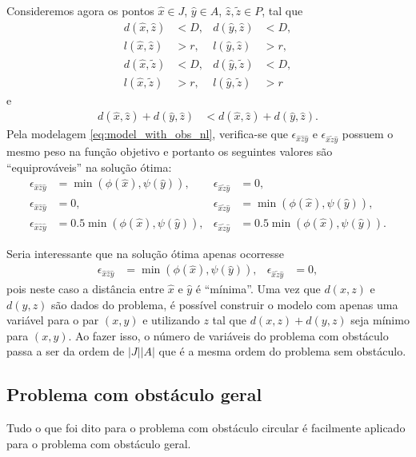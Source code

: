 Consideremos agora os pontos $\hat{x} \in J$, $\hat{y} \in A$, $\hat{z},
\tilde{z} \in P$, tal que
\begin{align*}
    d(\hat{x}, \hat{z}) &< D, & d(\hat{y}, \hat{z}) &< D, \\
    l(\hat{x}, \hat{z}) &> r, & l(\hat{y}, \hat{z}) &> r, \\
    d(\hat{x}, \tilde{z}) &< D, & d(\hat{y}, \tilde{z}) &< D, \\
    l(\hat{x}, \tilde{z}) &> r, & l(\hat{y}, \tilde{z}) &> r
\end{align*}
e
\begin{align*}
    d(\hat{x}, \hat{z}) + d(\hat{y}, \hat{z}) &< d(\hat{x}, \hat{z}) +
    d(\hat{y}, \hat{z}).
\end{align*}
Pela modelagem \eqref{eq:model_with_obs_nl}, verifica-se que
$\epsilon_{\hat{x}\hat{z}\hat{y}}$ e $\epsilon_{\hat{x}\tilde{z}\hat{y}}$
possuem o mesmo peso na fun\c{c}\~{a}o objetivo e portanto os seguintes valores
s\~{a}o ``equiprov\'{a}veis'' na solu\c{c}\~{a}o \'{o}tima:
\begin{align*}
    \epsilon_{\hat{x}\hat{z}\hat{y}} &= \min(\phi(\hat{x}), \psi(\hat{y})), &
    \epsilon_{\hat{x}\tilde{z}\hat{y}} &= 0, \\
    \epsilon_{\hat{x}\hat{z}\hat{y}} &= 0, &
    \epsilon_{\hat{x}\tilde{z}\hat{y}} &= \min(\phi(\hat{x}), \psi(\hat{y})), \\
    \epsilon_{\hat{x}\hat{z}\hat{y}} &= 0.5 \min(\phi(\hat{x}), \psi(\hat{y})), &
    \epsilon_{\hat{x}\tilde{z}\hat{y}} &= 0.5 \min(\phi(\hat{x}), \psi(\hat{y})).
\end{align*}

Seria interessante que na solu\c{c}\~{a}o \'{o}tima apenas ocorresse
\begin{align*}
    \epsilon_{\hat{x}\hat{z}\hat{y}} &= \min(\phi(\hat{x}), \psi(\hat{y})), &
    \epsilon_{\hat{x}\tilde{z}\hat{y}} &= 0,
\end{align*}
pois neste caso a dist\^{a}ncia entre $\hat{x}$ e $\hat{y}$ \'{e}
``m\'{i}nima''. Uma vez que $d(x, z)$ e $d(y, z)$ s\~{a}o dados do problema, \'{e}
poss\'{i}vel construir o modelo com apenas uma vari\'{a}vel para o par
$(x, y)$ e utilizando $z$ tal que $d(x, z) + d(y, z)$ seja m\'{i}nimo para $(x,
y)$. Ao fazer isso, o n\'{u}mero de vari\'{a}veis do problema com obst\'{a}culo
passa a ser da ordem de $|J| |A|$ que \'{e} a mesma ordem do problema sem
obst\'{a}culo.

\subsection{Problema com obst\'{a}culo geral}
Tudo o que foi dito para o problema com obst\'{a}culo circular \'{e} facilmente
aplicado para o problema com obst\'{a}culo geral.
